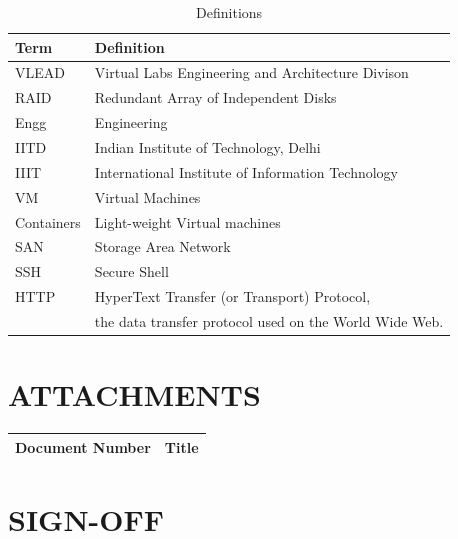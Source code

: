 \documentclass[11pt]{article}
\begin{document}
\begin{table}[H]
\caption{\label{tbl: Definitions}Definitions}
\begin{center}
\begin{tabular}{ll}
\hline
 Term        &  Definition                                              \\
\hline
 VLEAD       &  Virtual Labs Engineering and Architecture Divison       \\
 RAID        &  Redundant Array of Independent Disks                    \\
 Engg        &  Engineering                                             \\
 IITD        &  Indian Institute of Technology, Delhi                   \\
 IIIT        &  International Institute of Information Technology       \\
 VM          &  Virtual Machines                                        \\
 Containers  &  Light-weight Virtual machines                           \\
 SAN         &  Storage Area Network                                    \\
 SSH         &  Secure Shell                                            \\
 HTTP        &  HyperText Transfer (or Transport) Protocol,             \\
             &  the data transfer protocol used on the World Wide Web.  \\
\hline
\end{tabular}
\end{center}
\end{table}

\section{ATTACHMENTS}
\label{sec-14}



\begin{center}
\begin{tabular}{ll}
\hline
 Document Number  &  Title  \\
\hline
\end{tabular}
\end{center}



\section{SIGN-OFF}
\label{sec-15}
\end{document}

